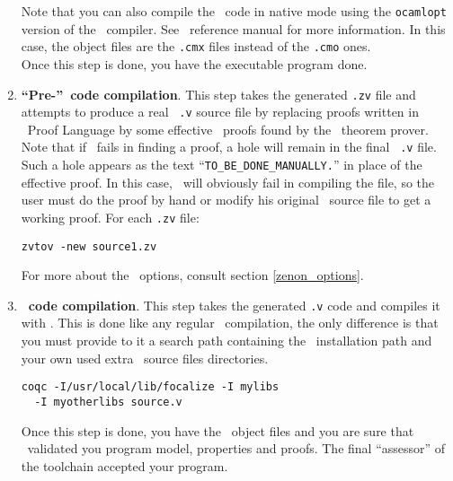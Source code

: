 \begin{enumerate}
    Note that you can also compile the \ocaml\ code in native mode
    using the {\tt ocamlopt} version of the \ocaml\ compiler. See
    \ocaml\ reference manual for more information. In this case, the
    object files are the {\tt .cmx} files instead of the {\tt .cmo}
    ones.\\
    Once this step is done, you have the executable program done.

  \item {\bf ``Pre-''\coq\ code compilation}. This step takes the
    generated {\tt .zv} file and attempts to produce a real \coq\
    {\tt .v} source file by replacing proofs written in \focal\ Proof
    Language by some effective \coq\ proofs found by the \zenon\
    theorem prover. Note that if \zenon\ fails in finding a proof, a
    hole will remain in the final \coq\ {\tt .v} file. Such a hole
    appears as the text ``{\tt TO\_BE\_DONE\_MANUALLY.}'' in place of
    the effective proof. In this case, \coq\ will obviously fail
    in compiling the file, so the user must do the proof by hand or
    modify his original \focal\ source file to get a working proof.
    For each {\tt .zv} file:
    \begin{center}
      {\tt zvtov -new source1.zv}
    \end{center}
    For more about the \zenon\ options, consult section
    \ref{zenon_options}.

  \item{\bf \coq\ code compilation}. This step takes the generated
    {\tt .v} code and compiles it with \coq. This is done like any
    regular \coq\ compilation, the only difference is that you must
    provide to it a search path containing the \focal\ installation
    path and your own used extra \focal\ source files directories.
    \begin{verbatim}
coqc -I/usr/local/lib/focalize -I mylibs
  -I myotherlibs source.v
    \end{verbatim}
    Once this step is done, you have the \coq\ object files and you
    are sure that \coq\ validated you program model, properties and
    proofs. The final ``assessor'' of the toolchain accepted your
    program.
\end{enumerate}
